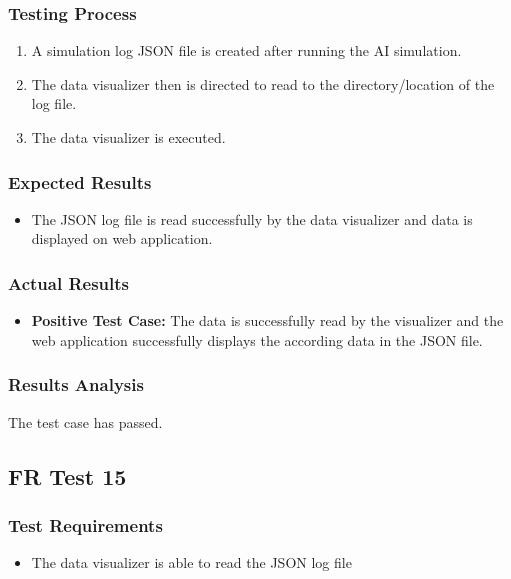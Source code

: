 \documentclass[12pt, titlepage]{article}
\providecommand{\DIFaddbegin}{} %
\providecommand{\DIFaddend}{} %
\begin{document}
\subsubsection{Testing Process}
\begin{enumerate}
    \item A simulation log JSON file is created after running the AI simulation.
    \item The data visualizer then is directed to read to the directory/location of the log file.
    \item The data visualizer is executed.
\end{enumerate}
\subsubsection{Expected Results}
\begin{itemize}
    \item The JSON log file is read successfully by the data visualizer and data is displayed on web application.
\end{itemize}
\subsubsection{Actual Results}
\begin{itemize}
    \item \textbf{Positive Test Case:} The data is successfully read by the visualizer and the web application successfully displays the according data in the JSON file.
\end{itemize}
\subsubsection{Results Analysis}
The test case has passed.
\DIFaddbegin 

\DIFaddend \subsection{FR Test 15}\DIFaddbegin \label{FRT15} 
\DIFaddend \subsubsection{Test Requirements}
\begin{itemize}
    \item The data visualizer is able to read the JSON log file
\end{itemize}
\end{document}
